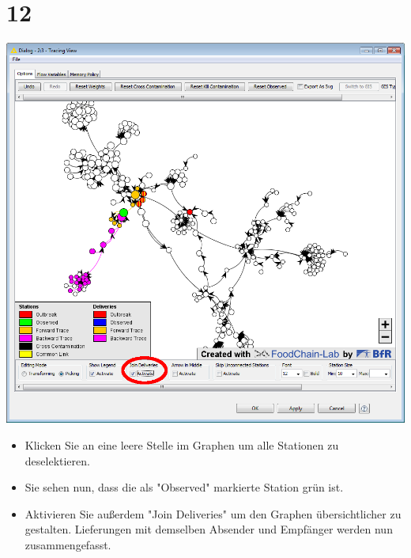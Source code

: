 \documentclass{beamer}
\begin{document}
\section{12}
\begin{frame}
	\begin{center}
  		\includegraphics[height=0.5\textheight]{12.png}
	\end{center}
	\begin{itemize}
		\item Klicken Sie an eine leere Stelle im Graphen um alle Stationen zu deselektieren.
		\item Sie sehen nun, dass die als "Observed" markierte Station grün ist.
		\item Aktivieren Sie außerdem "Join Deliveries" um den Graphen übersichtlicher zu gestalten. Lieferungen mit demselben Absender und Empfänger werden nun zusammengefasst.
	\end{itemize}
\end{frame}
\end{document}

